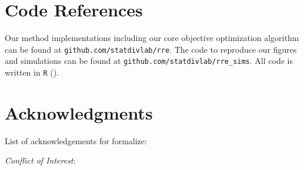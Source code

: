 \documentclass[oupdraft]{bio}
\begin{document}
\section{Code References}
\label{sec:code}
Our method implementations including our core objective optimization algorithm can be found at \texttt{github.com/statdivlab/rre}.  The code to reproduce our figures and simulations can be found at \texttt{github.com/statdivlab/rre\_sims}.  All code is written in \texttt{R} (\citet{r_project}).


\section*{Acknowledgments}
List of acknowledgements for formalize:

{\it Conflict of Interest}:



\end{document}
